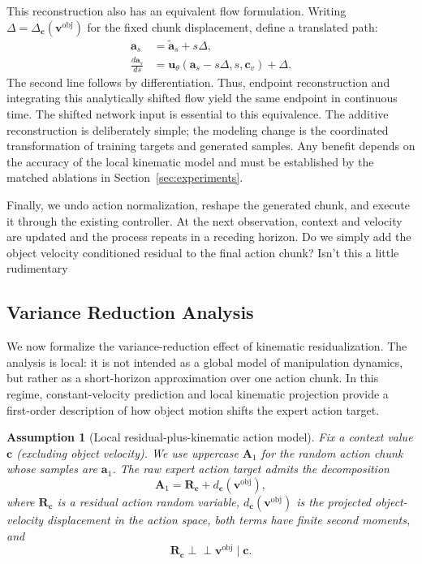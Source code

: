 \documentclass[10pt,twocolumn,letterpaper]{article}
\newcommand{\EditAP}[1]{{\color{blue} #1}}
\newtheorem{assumption}{Assumption}
\begin{document}
This reconstruction also has an equivalent flow formulation.
Writing $\Delta=\Delta_{\mathbf c}(\mathbf v^{\mathrm{obj}})$ for the fixed
chunk displacement, define a translated path:
\begin{align}
    \mathbf a_s&=\widetilde{\mathbf a}_s+s\Delta, \\
    \frac{d\mathbf a_s}{ds}
    &=\mathbf u_\theta(\mathbf a_s-s\Delta,s,\mathbf c_v)+\Delta.
    \label{eq:translated_action_flow}
\end{align}
The second line follows by differentiation. Thus, endpoint reconstruction
and integrating this analytically shifted flow yield the same endpoint
in continuous time. The shifted network input is essential to this equivalence.
The additive reconstruction is deliberately simple; the modeling change is
the coordinated transformation of training targets and generated samples.
Any benefit depends on the accuracy of the local kinematic model and must be
established by the matched ablations in Section~\ref{sec:experiments}.

Finally, we undo action normalization, reshape the generated chunk, and execute
it through the existing controller. At the next observation, context and
velocity are updated and the process repeats in a receding horizon.
\EditAP{Do we simply add the object velocity conditioned residual to the final action chunk? Isn't this a little rudimentary}

\subsection{Variance Reduction Analysis}
\label{subsec:variance_reduction}

We now formalize the variance-reduction effect of kinematic residualization.
The analysis is local: it is not intended as a global model of manipulation
dynamics, but rather as a short-horizon approximation over one action chunk. In
this regime, constant-velocity prediction and local kinematic projection provide
a first-order description of how object motion shifts the expert action target.

\begin{assumption}[Local residual-plus-kinematic action model]
\label{ass:local_residual_kinematic_model}
Fix a context value $\mathbf c$ (excluding object velocity). We use uppercase
$\mathbf A_1$ for the random action chunk whose samples are $\mathbf a_1$.
The raw expert action target admits the
decomposition
\begin{equation}
    \mathbf A_1
    =
    \mathbf R_{\mathbf c}
    +
    d_{\mathbf c}(\mathbf v^{\mathrm{obj}}),
    \label{eq:local_residual_kinematic_model}
\end{equation}
where $\mathbf R_{\mathbf c}$ is a residual action random variable,
$d_{\mathbf c}(\mathbf v^{\mathrm{obj}})$ is the projected object-velocity displacement in
the action space, both terms have finite second moments, and
\[
    \mathbf R_{\mathbf c}
    \perp\!\!\!\perp
    \mathbf v^{\mathrm{obj}}
    \mid
    \mathbf c.
\]
\end{assumption}
\end{document}
